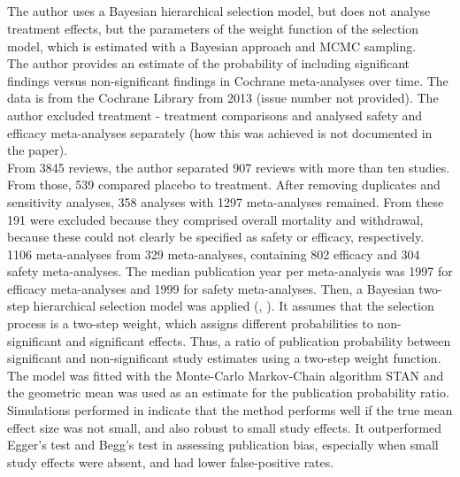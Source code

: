 \documentclass[11pt,a4paper,twoside]{book}\usepackage[]{graphicx}\usepackage[]{color}
\begin{document}
\subsection{\citet{kicinsky}}
The author uses a Bayesian hierarchical selection model, but does not analyse treatment effects, but the parameters of the weight function of the selection model, which is estimated with a Bayesian approach and MCMC sampling. \\
The author provides an estimate of the probability of including significant findings versus non-significant findings in Cochrane meta-analyses over time. The data is from the Cochrane Library from 2013 (issue number not provided). The author excluded treatment - treatment comparisons and analysed safety and efficacy meta-analyses separately (how this was achieved is not documented in the paper). \\
From 3845 reviews, the author separated 907 reviews with more than ten studies. From those, 539 compared placebo to treatment. After removing duplicates and sensitivity analyses, 358 analyses with 1297 meta-analyses remained. From these 191 were excluded because they comprised overall mortality and withdrawal, because these could not clearly be specified as safety or efficacy, respectively. \\
1106 meta-analyses from 329 meta-analyses, containing 802 efficacy and 304 safety meta-analyses. The median publication year per meta-analysis was 1997 for efficacy meta-analyses and 1999 for safety meta-analyses. Then, a Bayesian two-step hierarchical selection model was applied (\citet{bayesian.selection.model}, \citet{bayesian.selection.model.2}). It assumes that the selection process is a two-step weight, which assigns different probabilities to non-significant and significant effects. Thus, a ratio of publication probability between significant and non-significant study estimates using a two-step weight function. The model was fitted with the Monte-Carlo Markov-Chain algorithm STAN and the geometric mean was used as an estimate for the publication probability ratio. Simulations performed in \citep{bayesian.selection.model} indicate that the method performs well if the true mean effect size was not small, and also robust to small study effects. It outperformed Egger's test and Begg's test in assessing publication bias, especially when small study effects were absent, and had lower false-positive rates. \\
\end{document}
